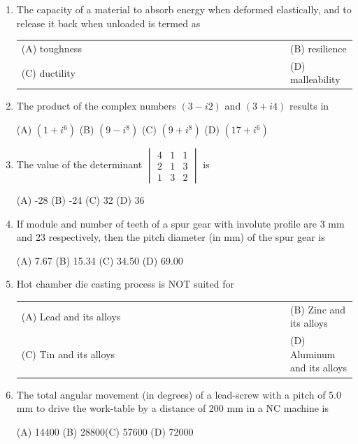 \documentclass[a4paper,12pt]{article}
\begin{document}
\begin{enumerate}[label=Q.\arabic*, leftmargin=*]
\item The capacity of a material to absorb energy when deformed elastically, and to release it back when unloaded is termed as
\begin{multicols}{2}
\begin{tabular}[t]{p{0.8\linewidth} p{0.9\linewidth}}
(A) toughness & (B) resilience \\
(C) ductility & (D) malleability \\
\end{tabular}
\end{multicols}

\item The product of the complex numbers \((3 - i2)\) and \((3 + i4)\) results in

(A) $(1 + i^6)$ \hfill (B) $(9-i^8)$ \hfill (C) $(9+i^8)$ \hfill (D) $(17 + i^6)$

\item The value of the determinant
$
\begin{vmatrix}
4 & 1 & 1 \\
2 & 1 & 3 \\
1 & 3 & 2
\end{vmatrix}
$
is

(A) -28 \hfill (B) -24 \hfill(C) 32 \hfill (D) 36 


\item If module and number of teeth of a spur gear with involute profile are 3 mm and 23 respectively, then the pitch diameter (in mm) of the spur gear is

(A) 7.67 \hfill (B) 15.34 \hfill (C) 34.50 \hfill (D) 69.00 

\item Hot chamber die casting process is NOT suited for
\begin{multicols}{2}
\begin{tabular}[t]{p{0.8\linewidth} p{0.9\linewidth}}
(A) Lead and its alloys & (B) Zinc and its alloys \\
(C) Tin and its alloys & (D) Aluminum and its alloys \\
\end{tabular}
\end{multicols}

\item The total angular movement (in degrees) of a lead-screw with a pitch of 5.0 mm to drive the work-table by a distance of 200 mm in a NC machine is

(A) 14400 \hfill(B) 28800\hfill  (C) 57600 \hfill (D) 72000


\end{enumerate}
\end{document}
